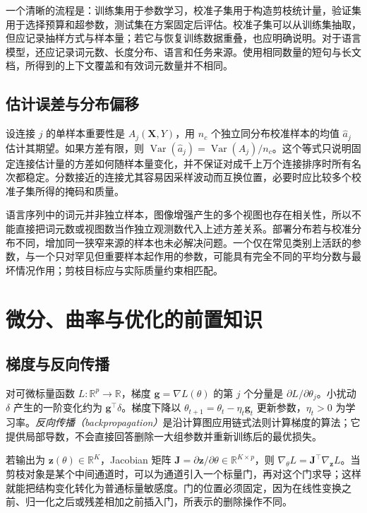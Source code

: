 \documentclass[UTF8,12pt,a4paper,fontset=fandol]{ctexart}
\begin{document}
一个清晰的流程是：训练集用于参数学习，校准子集用于构造剪枝统计量，验证集用于选择预算和超参数，测试集在方案固定后评估。校准子集可以从训练集抽取，但应记录抽样方式与样本量；若它与恢复训练数据重叠，也应明确说明。对于语言模型，还应记录词元数、长度分布、语言和任务来源。使用相同数量的短句与长文档，所得到的上下文覆盖和有效词元数量并不相同。

\subsection{估计误差与分布偏移}
设连接 $j$ 的单样本重要性是 $A_j(\mathbf X,Y)$，用 $n_c$ 个独立同分布校准样本的均值 $\widehat a_j$ 估计其期望。如果方差有限，则 $\operatorname{Var}(\widehat a_j)=\operatorname{Var}(A_j)/n_c$。这个等式只说明固定连接估计量的方差如何随样本量变化，并不保证对成千上万个连接排序时所有名次都稳定。分数接近的连接尤其容易因采样波动而互换位置，必要时应比较多个校准子集所得的掩码和质量。

语言序列中的词元并非独立样本，图像增强产生的多个视图也存在相关性，所以不能直接把词元数或视图数当作独立观测数代入上述方差关系。部署分布若与校准分布不同，增加同一狭窄来源的样本也未必解决问题。一个仅在常见类别上活跃的参数，与一个只对罕见但重要样本起作用的参数，可能具有完全不同的平均分数与最坏情况作用；剪枝目标应与实际质量约束相匹配。

\section{微分、曲率与优化的前置知识}
\label{sec:prune-calculus}

\subsection{梯度与反向传播}
对可微标量函数 $L:\mathbb R^p\to\mathbb R$，梯度 $\mathbf g=\nabla L(\theta)$ 的第 $j$ 个分量是 $\partial L/\partial\theta_j$。小扰动 $\delta$ 产生的一阶变化约为 $\mathbf g^\top\delta$。梯度下降以 $\theta_{t+1}=\theta_t-\eta_t\mathbf g_t$ 更新参数，$\eta_t>0$ 为学习率。\emph{反向传播（backpropagation）}是沿计算图应用链式法则计算梯度的算法；它提供局部导数，不会直接回答删除一大组参数并重新训练后的最优损失。

若输出为 $\mathbf z(\theta)\in\mathbb R^K$，Jacobian 矩阵 $\mathbf J=\partial\mathbf z/\partial\theta\in\mathbb R^{K\times p}$，则 $\nabla_\theta L=\mathbf J^\top\nabla_{\mathbf z}L$。当剪枝对象是某个中间通道时，可以为通道引入一个标量门，再对这个门求导；这样就能把结构变化转化为普通标量敏感度。门的位置必须固定，因为在线性变换之前、归一化之后或残差相加之前插入门，所表示的删除操作不同。
\end{document}

